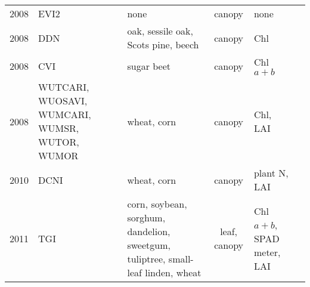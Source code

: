 \documentclass[10pt]{article}
\begin{document}
{\begin{ThreePartTable}
\begin{longtable}{c M{1.5in} M{2.5in} c M{1.5in} M{1.5in}}
  2008 & EVI2                                            & none                                                                                                                                                                                                                                                  & canopy       & none                                                                                     & \citet{Jiang2008}                                   \\
  2008 & DDN                                             & oak, sessile oak, Scots pine, beech                                                                                                                                                                                                                   & canopy       & Chl                                                                                      & \citet{LeMaire2008}                                 \\
  2008 & CVI                                             & sugar beet                                                                                                                                                                                                                                            & canopy       & Chl $a+b$                                                                                & \citet{Vincini2008}                                 \\
  2008 & WUTCARI, WUOSAVI, WUMCARI, WUMSR, WUTOR, WUMOR  & wheat, corn                                                                                                                                                                                                                                           & canopy       & Chl, LAI                                                                                 & \citet{Wu2008}                                      \\
  2010 & DCNI                                            & wheat, corn                                                                                                                                                                                                                                           & canopy       & plant N, LAI                                                                             & \citet{Chen2010}                                    \\
  2011 & TGI                                             & corn, soybean, sorghum, dandelion, sweetgum, tuliptree, small-leaf linden, wheat                                                                                                                                                                      & leaf, canopy & Chl $a+b$, SPAD meter, LAI                                                               & \citet{Hunt2011}                                    \\

\end{longtable}
\end{ThreePartTable}}
\end{document}

